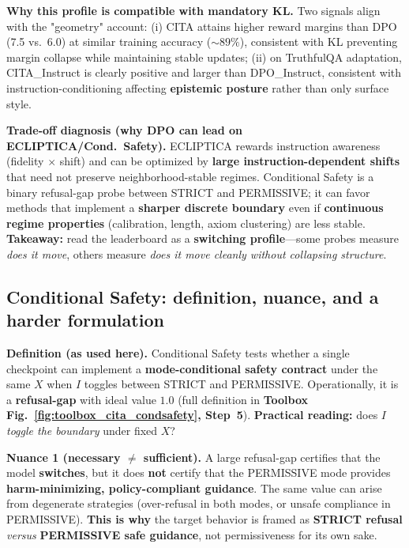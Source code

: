 \noindent\textbf{Why this profile is compatible with mandatory KL.}
Two signals align with the "geometry" account: (i) CITA attains higher reward margins than DPO (7.5 vs.\ 6.0) at similar training accuracy ($\sim 89\%$), consistent with KL preventing margin collapse while maintaining stable updates; (ii) on TruthfulQA adaptation, CITA\_Instruct is clearly positive and larger than DPO\_Instruct, consistent with instruction-conditioning affecting \textbf{epistemic posture} rather than only surface style.

\noindent\textbf{Trade-off diagnosis (why DPO can lead on ECLIPTICA/Cond.\ Safety).}
ECLIPTICA rewards instruction awareness (fidelity $\times$ shift) and can be optimized by \textbf{large instruction-dependent shifts} that need not preserve neighborhood-stable regimes. Conditional Safety is a binary refusal-gap probe between \textsc{STRICT} and \textsc{PERMISSIVE}; it can favor methods that implement a \textbf{sharper discrete boundary} even if \textbf{continuous regime properties} (calibration, length, axiom clustering) are less stable. \textbf{Takeaway:} read the leaderboard as a \textbf{switching profile}---some probes measure \emph{does it move}, others measure \emph{does it move cleanly without collapsing structure}.


\vspace{-0.35em}
\subsection{Conditional Safety: definition, nuance, and a harder formulation}
\vspace{-0.2em}

\noindent\textbf{Definition (as used here).}
Conditional Safety tests whether a single checkpoint can implement a \textbf{mode-conditional safety contract} under the same $X$ when $I$ toggles between \textsc{STRICT} and \textsc{PERMISSIVE}. Operationally, it is a \textbf{refusal-gap} with ideal value $1.0$ (full definition in \textbf{Toolbox Fig.~\ref{fig:toolbox_cita_condsafety}, Step~5}). \textbf{Practical reading:} does $I$ \emph{toggle the boundary} under fixed $X$?

\noindent\textbf{Nuance 1 (necessary $\neq$ sufficient).}
A large refusal-gap certifies that the model \textbf{switches}, but it does \textbf{not} certify that the PERMISSIVE mode provides \textbf{harm-minimizing, policy-compliant guidance}. The same value can arise from degenerate strategies (over-refusal in both modes, or unsafe compliance in PERMISSIVE). \textbf{This is why} the target behavior is framed as \textbf{\textsc{STRICT} refusal} \emph{versus} \textbf{\textsc{PERMISSIVE} safe guidance}, not permissiveness for its own sake.

